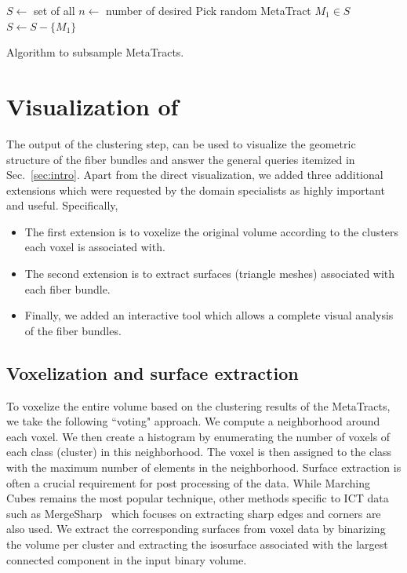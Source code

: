 \begin{algorithm}[t]
	$S \leftarrow$ set of all \mt\;
	$n \leftarrow$ number of desired \mt\;
	Pick random MetaTract $M_1 \in S$\;
	$S \leftarrow S -\{M_1\}$\;
	\caption{Algorithm to subsample MetaTracts.}
	\label{algo:subsample}
\end{algorithm}

\section{Visualization of \mt}
\label{sec:vis}
The output of the clustering step, can be used to visualize the geometric structure of the fiber bundles and answer the general queries itemized in Sec.~\ref{sec:intro}. Apart from the direct \mt visualization, we added three additional extensions which were requested by the domain specialists as highly important and useful. Specifically, 
\begin{itemize}[noitemsep,nolistsep]
	\item The first extension is to voxelize the original volume according to the clusters each voxel is associated with.
	\item The second extension is to extract surfaces (triangle meshes) associated with each fiber bundle. 
	\item Finally, we added an interactive tool which allows a complete visual analysis of the fiber bundles. 
\end{itemize}
\subsection{Voxelization and surface extraction}\label{subsec:voxel_surf_extraction}
To voxelize the entire volume based on the clustering results of the MetaTracts, we take the following ``voting" approach.
We compute a neighborhood around each voxel. We then create a histogram by  enumerating the number of voxels of each class (cluster) in this neighborhood. The voxel is then assigned to the class with the maximum number of elements in the neighborhood. 
Surface extraction is often a crucial requirement for post processing of the data. While Marching Cubes\cite{Lorensen1987} remains the most popular technique, other methods specific to ICT data such as MergeSharp~\cite{Bhattacharya2013} which focuses on extracting sharp edges and corners are also used.  
We extract the corresponding surfaces from voxel data by binarizing the volume per cluster and extracting the isosurface associated with the largest connected component in the input binary volume. 

